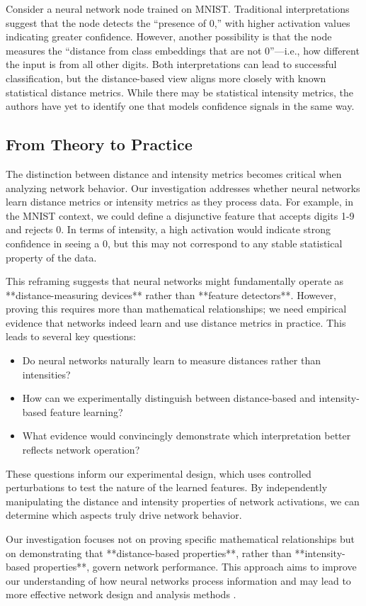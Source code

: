 Consider a neural network node trained on MNIST. Traditional interpretations suggest that the node detects the “presence of 0,” with higher activation values indicating greater confidence. However, another possibility is that the node measures the “distance from class embeddings that are not 0”—i.e., how different the input is from all other digits. Both interpretations can lead to successful classification, but the distance-based view aligns more closely with known statistical distance metrics. While there may be statistical intensity metrics, the authors have yet to identify one that models confidence signals in the same way.

\subsection{From Theory to Practice}

The distinction between distance and intensity metrics becomes critical when analyzing network behavior. Our investigation addresses whether neural networks learn distance metrics or intensity metrics as they process data. For example, in the MNIST context, we could define a disjunctive feature that accepts digits 1-9 and rejects 0. In terms of intensity, a high activation would indicate strong confidence in seeing a 0, but this may not correspond to any stable statistical property of the data.

This reframing suggests that neural networks might fundamentally operate as **distance-measuring devices** rather than **feature detectors**. However, proving this requires more than mathematical relationships; we need empirical evidence that networks indeed learn and use distance metrics in practice. This leads to several key questions:

\begin{itemize}
    \item Do neural networks naturally learn to measure distances rather than intensities?
    \item How can we experimentally distinguish between distance-based and intensity-based feature learning?
    \item What evidence would convincingly demonstrate which interpretation better reflects network operation?
\end{itemize}

These questions inform our experimental design, which uses controlled perturbations to test the nature of the learned features. By independently manipulating the distance and intensity properties of network activations, we can determine which aspects truly drive network behavior.

Our investigation focuses not on proving specific mathematical relationships but on demonstrating that **distance-based properties**, rather than **intensity-based properties**, govern network performance. This approach aims to improve our understanding of how neural networks process information and may lead to more effective network design and analysis methods \citep{montavon2018methods, samek2019explainable}.